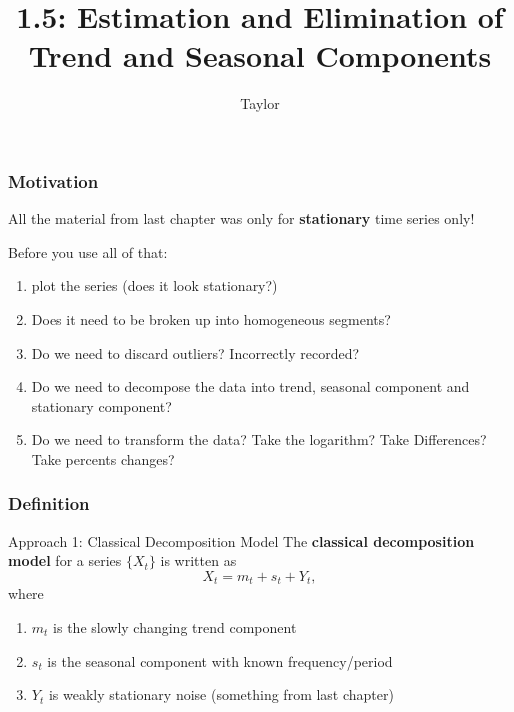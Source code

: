 \documentclass{beamer}
\title["1.5"]{1.5: Estimation and Elimination of Trend and Seasonal Components}
\author{Taylor}
\institute[UVA] 
{
University of Virginia \\
\medskip
\textit{} 
}
\date{}
\begin{document}

\begin{frame}
\titlepage 
\end{frame}

\begin{frame}
\frametitle{Motivation}

All the material from last chapter was only for {\bf stationary} time series only!
\newline

Before you use all of that:
\begin{enumerate}
\item plot the series (does it look stationary?)
\item Does it need to be broken up into homogeneous segments?
\item Do we need to discard outliers? Incorrectly recorded?
\item Do we need to decompose the data into trend, seasonal component and stationary component?
\item Do we need to transform the data? Take the logarithm? Take Differences? Take percents changes?
\end{enumerate}

\end{frame}





\begin{frame}
\frametitle{Definition}

\begin{block}{Approach 1: Classical Decomposition Model}
The {\bf classical decomposition model} for a series $\{X_t\}$ is written as
\[
X_t = m_t + s_t + Y_t,
\]
where
\begin{enumerate}
\item $m_t$ is the slowly changing trend component
\item $s_t$ is the seasonal component with known frequency/period
\item $Y_t$ is weakly stationary noise (something from last chapter)
\end{enumerate}
\end{block}




\end{frame}
\end{document}
